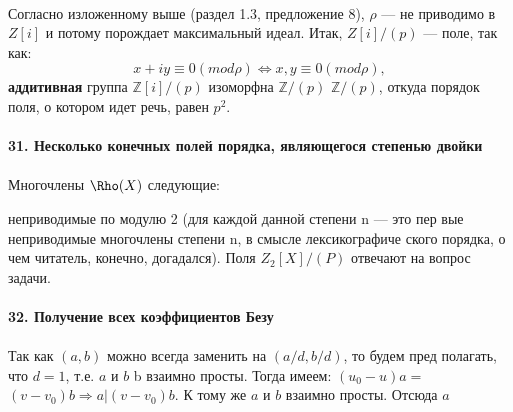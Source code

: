 \documentclass{../../template/mai_book}
\begin{document}
\\
\hspace*{0pt} Согласно изложенному выше (раздел 1.3, предложение 8), $\rho$ --- не­\linebreak
приводимо в $Z[i]$ и потому порождает максимальный идеал. Итак,\linebreak
$Z[i]/(p)$ ---  поле, так как:
$$x + iy \equiv 0 (mod \rho) \Longleftrightarrow x, y \equiv 0 (mod \rho ),$$
\textbf{аддитивная} группа $\mathbb{Z}[i]/(p)$  изоморфна $\mathbb{Z}/(p)$ \times $\mathbb{Z}/(p)$, откуда порядок\linebreak
поля, о котором идет речь, равен $p^{2}$.\\
\\
\noindent\textbf{31. Несколько конечных полей порядка, являющегося\linebreak
степенью двойки}\\
\\
\hspace*{0pt} Многочлены $\Rho(X)$ следующие:\\
			\begin{array}{llll}
							 $X^2 + X + 1$,   & $X^3 + X + 1$,   & $X^4} + X + 1$,\\ 

			                          & $X^5 + X^2 + 1$, & $X^6 + X + 1$, & $X^7 + X + 1$, 
			\end{array}
\newpage
\noindent неприводимые по модулю 2 (для каждой данной степени n --- это пер­\linebreak 
вые неприводимые многочлены степени n, в смысле лексикографиче­\linebreak
ского порядка, о чем читатель, конечно, догадался). Поля $Z_2[X]/(P)$\linebreak
отвечают на вопрос задачи.\\
\\
\noindent\textbf{32. Получение всех коэффициентов Безу}\\
\\
\hspace*{15pt} Так как $(a, b)$ можно всегда заменить на $(a/d, b/d)$, то будем пред­\linebreak
полагать, что $d = 1$, т.е. $a$ и $b$ b взаимно просты. Тогда имеем: $(u_0 - u)a =$ \linebreak
$(v - v_0)b \Rightarrow a | (v - v_0)b$. К тому же $a$ и $b$  взаимно просты. Отсюда $a$\linebreak
\end{document}
